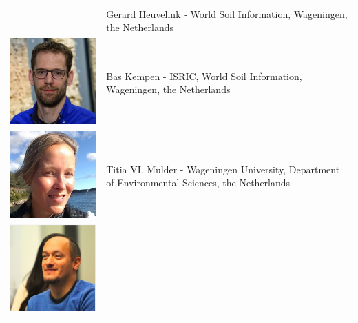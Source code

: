 \documentclass[10pt,b5paper,]{book}
\theoremstyle{definition}
\theoremstyle{definition}
\theoremstyle{definition}
\theoremstyle{remark}
\begin{document}
\begin{longtable}[]{@{}ll@{}}
\begin{minipage}[t]{0.11\columnwidth}
\end{minipage} & \begin{minipage}[t]{0.83\columnwidth}\raggedright
Gerard Heuvelink - World Soil Information, Wageningen, the
Netherlands\strut
\end{minipage}\tabularnewline
\begin{minipage}[t]{0.11\columnwidth}\raggedright
\includegraphics{contrAuthors/Kempen.jpg}\strut
\end{minipage} & \begin{minipage}[t]{0.83\columnwidth}\raggedright
Bas Kempen - ISRIC, World Soil Information, Wageningen, the
Netherlands\strut
\end{minipage}\tabularnewline
\begin{minipage}[t]{0.11\columnwidth}\raggedright
\includegraphics{contrAuthors/Mulder.jpeg}\strut
\end{minipage} & \begin{minipage}[t]{0.83\columnwidth}\raggedright
Titia VL Mulder - Wageningen University, Department of Environmental
Sciences, the Netherlands\strut
\end{minipage}\tabularnewline
\begin{minipage}[t]{0.11\columnwidth}\raggedright
\includegraphics{contrAuthors/Olmedo.png}\strut

\end{minipage}
\end{longtable}
\end{document}
